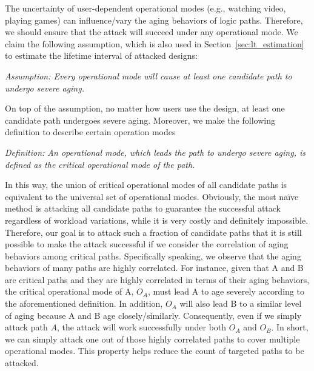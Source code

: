 The uncertainty of user-dependent operational modes (e.g., watching video, playing games) can influence/vary the aging behaviors of logic paths. Therefore, we should ensure that the attack will succeed under any operational mode. We claim the following assumption, which is also used in Section~\ref{sec:lt_estimation} to estimate the lifetime interval of attacked designs:

{\setlength{\parskip}{3pt}
\noindent \textit{Assumption: Every operational mode will cause at least one candidate path to undergo severe aging.}

On top of the assumption, no matter how users use the design, at least one candidate path undergoes severe aging. Moreover, we make the following definition to describe certain operation modes

\noindent \textit{Definition: An operational mode, which leads the path to undergo severe aging, is defined as the critical operational mode of the path.}
}

In this way, the union of critical operational modes of all candidate paths is equivalent to the universal set of operational modes. Obviously, the most na\"ive method is attacking all candidate paths to guarantee the successful attack regardless of workload variations, while it is very costly and definitely impossible. Therefore, our goal is to attack such a fraction of candidate paths that it is still possible to make the attack successful if we consider the correlation of aging behaviors among critical paths. Specifically speaking, we observe that the aging behaviors of many paths are highly correlated. For instance, given that A and B are critical paths and they are highly correlated in terms of their aging behaviors, the critical operational mode of A, $O_{A}$, must lead A to age severely according to the aforementioned definition. In addition, $O_{A}$ will also lead B to a similar level of aging because A and B age closely/similarly. Consequently, even if we simply attack path $A$, the attack will work successfully under both $O_{A}$ and $O_{B}$. In short, we can simply attack one out of those highly correlated paths to cover multiple operational modes. This property helps reduce the count of targeted paths to be attacked.%

